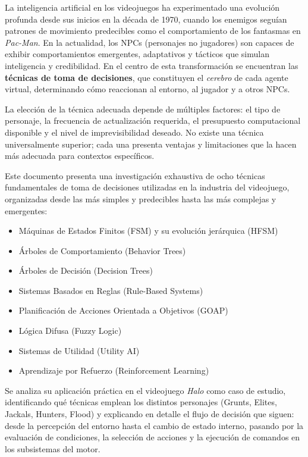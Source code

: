 \documentclass[12pt,letterpaper]{article}
\begin{document}
La inteligencia artificial en los videojuegos ha experimentado una evolución profunda desde sus inicios en la década de 1970, cuando los enemigos seguían patrones de movimiento predecibles como el comportamiento de los fantasmas en \textit{Pac-Man}. En la actualidad, los NPCs (personajes no jugadores) son capaces de exhibir comportamientos emergentes, adaptativos y tácticos que simulan inteligencia y credibilidad. En el centro de esta transformación se encuentran las \textbf{técnicas de toma de decisiones}, que constituyen el \textit{cerebro} de cada agente virtual, determinando cómo reaccionan al entorno, al jugador y a otros NPCs.

La elección de la técnica adecuada depende de múltiples factores: el tipo de personaje, la frecuencia de actualización requerida, el presupuesto computacional disponible y el nivel de imprevisibilidad deseado. No existe una técnica universalmente superior; cada una presenta ventajas y limitaciones que la hacen más adecuada para contextos específicos.

Este documento presenta una investigación exhaustiva de ocho técnicas fundamentales de toma de decisiones utilizadas en la industria del videojuego, organizadas desde las más simples y predecibles hasta las más complejas y emergentes:

\begin{itemize}[nosep]
  \item Máquinas de Estados Finitos (FSM) y su evolución jerárquica (HFSM)
  \item Árboles de Comportamiento (Behavior Trees)
  \item Árboles de Decisión (Decision Trees)
  \item Sistemas Basados en Reglas (Rule-Based Systems)
  \item Planificación de Acciones Orientada a Objetivos (GOAP)
  \item Lógica Difusa (Fuzzy Logic)
  \item Sistemas de Utilidad (Utility AI)
  \item Aprendizaje por Refuerzo (Reinforcement Learning)
\end{itemize}

Se analiza su aplicación práctica en el videojuego \textit{Halo} como caso de estudio, identificando qué técnicas emplean los distintos personajes (Grunts, Elites, Jackals, Hunters, Flood) y explicando en detalle el flujo de decisión que siguen: desde la percepción del entorno hasta el cambio de estado interno, pasando por la evaluación de condiciones, la selección de acciones y la ejecución de comandos en los subsistemas del motor.
\end{document}
